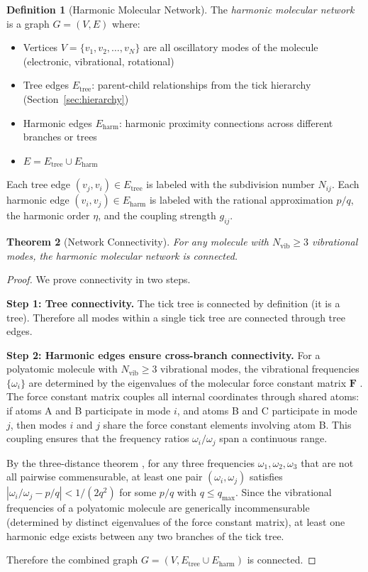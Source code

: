 \documentclass[11pt,a4paper]{article}
\newtheorem{theorem}{Theorem}[section]
\theoremstyle{definition}
\newtheorem{definition}[theorem]{Definition}
\theoremstyle{remark}
\newcommand{\qmax}{q_{\mathrm{max}}}
\begin{document}
\begin{definition}[Harmonic Molecular Network]
\label{def:harmonic_network}
The \emph{harmonic molecular network} is a graph $G = (V, E)$ where:
\begin{itemize}[nosep]
\item Vertices $V = \{v_1, v_2, \ldots, v_N\}$ are all oscillatory modes of the molecule (electronic, vibrational, rotational)
\item Tree edges $E_{\mathrm{tree}}$: parent-child relationships from the tick hierarchy (Section~\ref{sec:hierarchy})
\item Harmonic edges $E_{\mathrm{harm}}$: harmonic proximity connections across different branches or trees
\item $E = E_{\mathrm{tree}} \cup E_{\mathrm{harm}}$
\end{itemize}
Each tree edge $(v_j, v_i) \in E_{\mathrm{tree}}$ is labeled with the subdivision number $N_{ij}$. Each harmonic edge $(v_i, v_j) \in E_{\mathrm{harm}}$ is labeled with the rational approximation $p/q$, the harmonic order $\eta$, and the coupling strength $g_{ij}$.
\end{definition}

\begin{theorem}[Network Connectivity]
\label{thm:network_connectivity}
For any molecule with $N_{\mathrm{vib}} \geq 3$ vibrational modes, the harmonic molecular network is connected.
\end{theorem}

\begin{proof}
We prove connectivity in two steps.

\textbf{Step 1: Tree connectivity.} The tick tree is connected by definition (it is a tree). Therefore all modes within a single tick tree are connected through tree edges.

\textbf{Step 2: Harmonic edges ensure cross-branch connectivity.} For a polyatomic molecule with $N_{\mathrm{vib}} \geq 3$ vibrational modes, the vibrational frequencies $\{\omega_i\}$ are determined by the eigenvalues of the molecular force constant matrix $\mathbf{F}$ \citep{wilson1955}. The force constant matrix couples all internal coordinates through shared atoms: if atoms A and B participate in mode $i$, and atoms B and C participate in mode $j$, then modes $i$ and $j$ share the force constant elements involving atom B. This coupling ensures that the frequency ratios $\omega_i/\omega_j$ span a continuous range.

By the three-distance theorem \citep{hardy1979}, for any three frequencies $\omega_1, \omega_2, \omega_3$ that are not all pairwise commensurable, at least one pair $(\omega_i, \omega_j)$ satisfies $|\omega_i/\omega_j - p/q| < 1/(2q^2)$ for some $p/q$ with $q \leq \qmax$. Since the vibrational frequencies of a polyatomic molecule are generically incommensurable (determined by distinct eigenvalues of the force constant matrix), at least one harmonic edge exists between any two branches of the tick tree.

Therefore the combined graph $G = (V, E_{\mathrm{tree}} \cup E_{\mathrm{harm}})$ is connected.
\end{proof}
\end{document}

